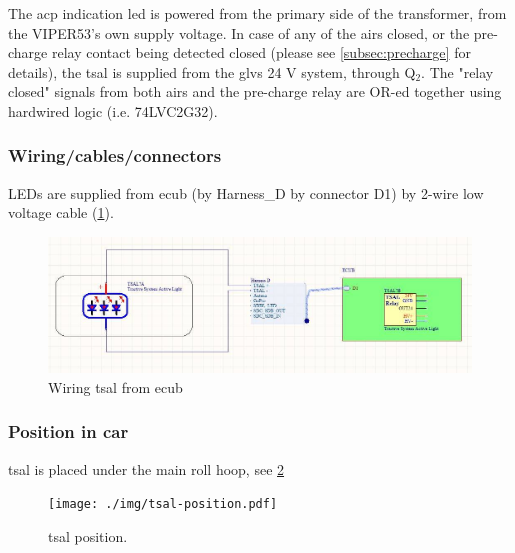 The \gls{acp} indication led is powered from the primary side of the transformer, from the VIPER53's own supply voltage.
In case of any of the \glspl{air} closed, or the pre-charge relay contact being detected closed (please see \ref{subsec:precharge}  for details), the \gls{tsal} is supplied from the \gls{glvs} 24 V system, through Q$_2$. The "relay closed" signals from both \glspl{air} and the pre-charge relay are OR-ed together using hardwired logic (i.e. 74LVC2G32).

\subsubsection{Wiring/cables/connectors}

LEDs are supplied from \gls{ecub} (by Harness\_D by connector D1) by 2-wire low voltage cable (\ref{fig:TSAL-wiring}).

\begin{figure}[H]
	\centering
	\includegraphics[width=\textwidth,]{./img/tsal-wiring.jpg}
	\caption{Wiring \gls{tsal} from \gls{ecub}}
	\label{fig:TSAL-wiring}
\end{figure}

\subsubsection{Position in car}
\gls{tsal} is placed under the main roll hoop, see \ref{fig:TSAL-position}

\begin{figure}[H]
	\centering
	\texttt{[image: ./img/tsal-position.pdf]}
	\caption{\Gls{tsal} position.}
	\label{fig:TSAL-position}
\end{figure}
